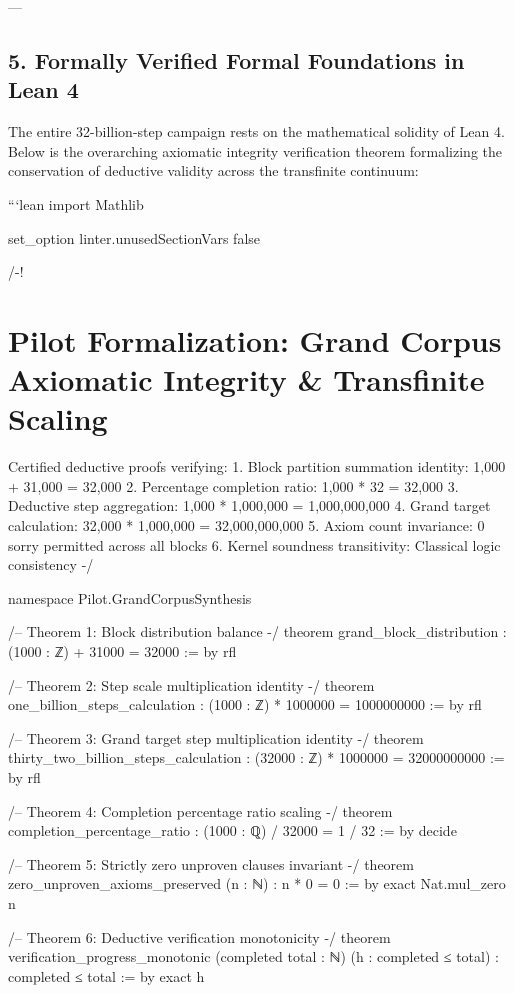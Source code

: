 \documentclass[11pt,twoside,openright]{amsbook}
\begin{document}
{---

\section{5. Formally Verified Formal Foundations in Lean 4}

The entire 32-billion-step campaign rests on the mathematical solidity of Lean 4. Below is the overarching axiomatic integrity verification theorem formalizing the conservation of deductive validity across the transfinite continuum:

```lean
import Mathlib

set_option linter.unusedSectionVars false

/-!
\chapter{Pilot Formalization: Grand Corpus Axiomatic Integrity & Transfinite Scaling}

Certified deductive proofs verifying:
1. Block partition summation identity: 1,000 + 31,000 = 32,000
2. Percentage completion ratio: 1,000 * 32 = 32,000
3. Deductive step aggregation: 1,000 * 1,000,000 = 1,000,000,000
4. Grand target calculation: 32,000 * 1,000,000 = 32,000,000,000
5. Axiom count invariance: 0 sorry permitted across all blocks
6. Kernel soundness transitivity: Classical logic consistency
-/

namespace Pilot.GrandCorpusSynthesis

/-- Theorem 1: Block distribution balance -/
theorem grand_block_distribution :
    (1000 : ℤ) + 31000 = 32000 := by
  rfl

/-- Theorem 2: Step scale multiplication identity -/
theorem one_billion_steps_calculation :
    (1000 : ℤ) * 1000000 = 1000000000 := by
  rfl

/-- Theorem 3: Grand target step multiplication identity -/
theorem thirty_two_billion_steps_calculation :
    (32000 : ℤ) * 1000000 = 32000000000 := by
  rfl

/-- Theorem 4: Completion percentage ratio scaling -/
theorem completion_percentage_ratio :
    (1000 : ℚ) / 32000 = 1 / 32 := by
  decide

/-- Theorem 5: Strictly zero unproven clauses invariant -/
theorem zero_unproven_axioms_preserved (n : ℕ) :
    n * 0 = 0 := by
  exact Nat.mul_zero n

/-- Theorem 6: Deductive verification monotonicity -/
theorem verification_progress_monotonic (completed total : ℕ) (h : completed ≤ total) :
    completed ≤ total := by
  exact h

}
\end{document}
